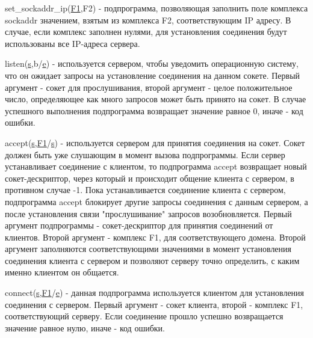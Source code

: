 \documentclass[12t,english,russian]{article}
\begin{document}
\label{set_sockaddr_ip}
set\_sockaddr\_ip(\hyperref[sockaddr]{F1},F2) - подпрограмма, позволяющая заполнить поле комплекса sockaddr значением, взятым из комплекса F2, соответствующим IP адресу. В случае, если комплекс заполнен нулями, для установления соединения будут использованы все IP-адреса сервера.

\label{listen}
listen(\hyperref[socket]{s},b/\hyperref[error]{e}) - используется сервером, чтобы уведомить операционную систему, что он ожидает запросы на установление соединения на данном сокете. Первый аргумент - сокет для прослушивания, второй аргумент - целое положительное число, определяющее как много запросов может быть принято на сокет. В случае успешного выполнения подпрограмма возвращает значение равное 0, иначе - код ошибки.

\label{accept}
accept(\hyperref[socket]{s},\hyperref[sockaddr]{F1}/\hyperref[socket]{s}) - используется сервером для принятия соединения на сокет. Сокет должен быть уже слушающим в момент вызова подпрограммы. Если сервер устанавливает соединение с клиентом, то подпрограмма accept возвращает новый сокет-дескриптор, через который и происходит общение клиента с сервером, в противном случае -1. Пока устанавливается соединение клиента с сервером, подпрограмма accept блокирует другие запросы соединения с данным сервером, а после установления связи "прослушивание" запросов возобновляется. Первый аргумент подпрограммы - сокет-дескриптор для принятия соединений от клиентов. Второй аргумент - комплекс F1, для соответствующего домена. Второй аргумент заполняются соответствующими значениями в момент установления соединения клиента с сервером и позволяют серверу точно определить, с каким именно клиентом он общается.

\label{connect}
connect(\hyperref[socket]{s},\hyperref[sockaddr]{F1}/\hyperref[error]{e}) - данная подпрограмма используется клиентом для установления соединения с сервером. Первый аргумент - сокет клиента, второй - комплекс F1, соответствующий серверу. Если соединение прошло успешно возвращается значение равное нулю, иначе - код ошибки.
\end{document}
